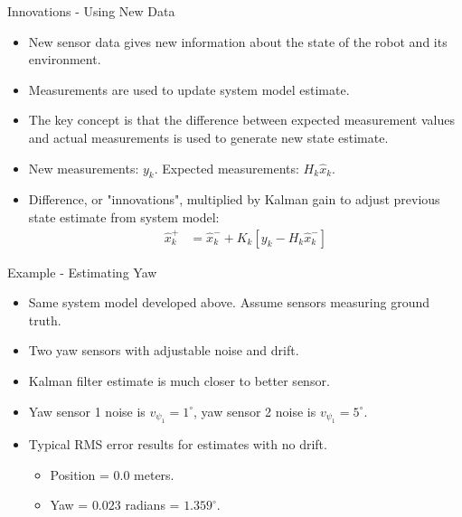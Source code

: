 \documentclass[hyperref={pdfpagelabels=false}]{beamer}
\begin{document}
\begin{frame}{Innovations - Using New Data}
\begin{itemize}
\item New sensor data gives new information about the state of the robot and its environment.
\item Measurements are used to update system model estimate.
\item The key concept is that the difference between expected measurement values and actual measurements is used to generate new state estimate.
\item New measurements: $y_k$. Expected measurements: $H_k\hat{x}_k$.
\item Difference, or "innovations", multiplied by Kalman gain to adjust previous state estimate from system model:
\begin{align*}
\hat{x}_k^+ &= \hat{x}_k^- + K_k\left[y_k - H_k\hat{x}_k^-\right]
\end{align*}
\end{itemize}
\end{frame}

\begin{frame}{Example - Estimating Yaw}
\begin{itemize}
\item Same system model developed above. Assume sensors measuring ground truth.
\item Two yaw sensors with adjustable noise and drift.
\item Kalman filter estimate is much closer to better sensor.
\item Yaw sensor 1 noise is $v_{\psi_1} = 1^\circ$, yaw sensor 2 noise is $v_{\psi_1} = 5^\circ$.
\item Typical RMS error results for estimates with no drift.
\begin{itemize}
\item Position = $0.0$ meters.
\item Yaw = $0.023$ radians = $1.359^\circ$.
\end{itemize}
\end{itemize}
\end{frame}
\end{document}
